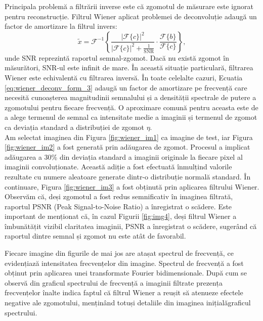 \documentclass[12pt]{article}
\begin{document}
Principala problemă a filtrării inverse este că zgomotul de măsurare este ignorat pentru reconstrucție. Filtrul Wiener aplicat problemei de deconvoluție adaugă un factor de amortizare la filtrul invers:
\begin{equation}
\tilde{x} = \mathcal{F}^{-1}\left\{\frac{|\mathcal{F}\{c\}|^2}{|\mathcal{F}\{c\}|^2 + \frac{1}{\text{SNR}}} \cdot \frac{\mathcal{F}\{b\}}{\mathcal{F}\{c\}}\right\},
\label{eq:wiener_deconv_form_3}
\end{equation}
unde SNR reprezintă raportul semnal-zgomot. Dacă nu există zgomot în măsurători, SNR-ul este infinit de mare. În această situație particulară, filtrarea Wiener este echivalentă cu filtrarea inversă. În toate celelalte cazuri, Ecuatia \ref{eq:wiener_deconv_form_3} adaugă un factor de amortizare pe frecvență care necesită cunoașterea magnitudinii semnalului și a densității spectrale de putere a zgomotului pentru fiecare frecvență. O aproximare comună pentru aceasta este de a alege termenul de semnal ca intensitate medie a imaginii și termenul de zgomot ca deviația standard a distribuției de zgomot ${\eta}$.\\

Am selectat imaginea din Figura \ref{fig:wiener_im1} ca imagine de test, iar Figura \ref{fig:wiener_im2} a fost generată prin adăugarea de zgomot. Procesul a implicat adăugarea a 30\% din deviația standard a imaginii originale la fiecare pixel al imaginii convoluționate. Această adiție a fost efectuată înmulțind valorile rezultate cu numere aleatoare generate dintr-o distribuție normală standard. În continuare, Figura \ref{fig:wiener_im3} a fost obținută prin aplicarea filtrului Wiener. Observăm că, deși zgomotul a fost redus semnificativ în imaginea filtrată, raportul PSNR (Peak Signal-to-Noise Ratio) a înregistrat o scădere. Este important de menționat că, în cazul Figurii \ref{fig:img4}, deși filtrul Wiener a îmbunătățit vizibil claritatea imaginii, PSNR a înregistrat o scădere, sugerând că raportul dintre semnal și zgomot nu este atât de favorabil. 

Fiecare imagine din figurile de mai jos are atașat spectrul de frecvență, ce evidențiază intensitatea frecvențelor din imagine. Spectrul de frecvență a fost obținut prin aplicarea unei transformate Fourier bidimensionale. După cum se observă din graficul spectrului de frecvență a imaginii filtrate prezența frecvențelor înalte indica faptul că filtrul Wiener a reușit să atenueze efectele negative ale zgomotului, menținând totuși detaliile din imaginea inițialăgraficul spectrului.
\end{document}

